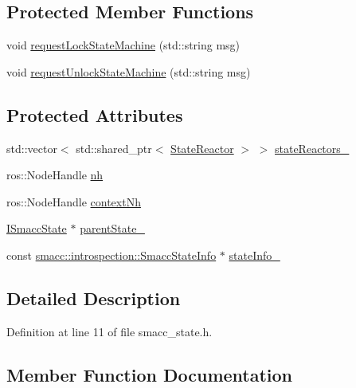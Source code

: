 \subsection*{Protected Member Functions}
\begin{DoxyCompactItemize}
\item 
void \hyperlink{classsmacc_1_1ISmaccState_ae733140761345e027713bd622d93bf0f}{request\+Lock\+State\+Machine} (std\+::string msg)
\item 
void \hyperlink{classsmacc_1_1ISmaccState_a3bf006f25d5b9c0534c8e89ae2e93d40}{request\+Unlock\+State\+Machine} (std\+::string msg)
\end{DoxyCompactItemize}
\subsection*{Protected Attributes}
\begin{DoxyCompactItemize}
\item 
std\+::vector$<$ std\+::shared\+\_\+ptr$<$ \hyperlink{classsmacc_1_1StateReactor}{State\+Reactor} $>$ $>$ \hyperlink{classsmacc_1_1ISmaccState_a7410a353b515f7b7357e94ef619a6c45}{state\+Reactors\+\_\+}
\item 
ros\+::\+Node\+Handle \hyperlink{classsmacc_1_1ISmaccState_a13fe6e6abfdb87996402189d44b78494}{nh}
\item 
ros\+::\+Node\+Handle \hyperlink{classsmacc_1_1ISmaccState_ae59191a663a08489b7d10036f3b25238}{context\+Nh}
\item 
\hyperlink{classsmacc_1_1ISmaccState}{I\+Smacc\+State} $\ast$ \hyperlink{classsmacc_1_1ISmaccState_ad61db41d8d06a836e7d1dac7767f5695}{parent\+State\+\_\+}
\item 
const \hyperlink{classsmacc_1_1introspection_1_1SmaccStateInfo}{smacc\+::introspection\+::\+Smacc\+State\+Info} $\ast$ \hyperlink{classsmacc_1_1ISmaccState_af20df2cfd3aa826fe02a3d703dc63c1b}{state\+Info\+\_\+}
\end{DoxyCompactItemize}


\subsection{Detailed Description}


Definition at line 11 of file smacc\+\_\+state.\+h.



\subsection{Member Function Documentation}
\mbox{\label{classsmacc_1_1ISmaccState_ad129c58b69a90e7056f2b3c3fa139a24}} 
